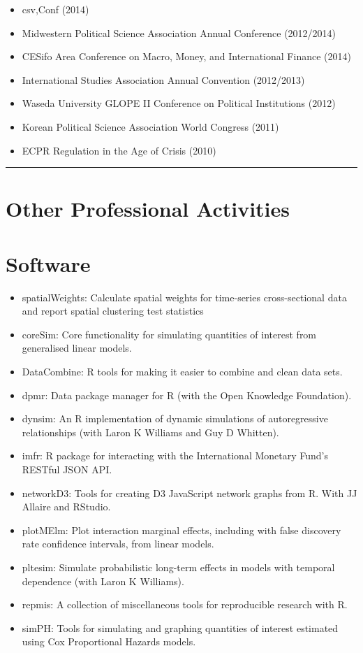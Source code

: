 \documentclass[a4paper]{article}
\begin{document}
\begin{itemize}
    \item csv,Conf (2014)
    \item Midwestern Political Science Association Annual Conference (2012/2014)
    \item CESifo Area Conference on Macro, Money, and International Finance (2014)
    \item International Studies Association Annual Convention (2012/2013)
    \item Waseda University GLOPE II Conference on Political Institutions (2012)
    \item Korean Political Science Association World Congress (2011)
    \item ECPR Regulation in the Age of Crisis (2010)
\end{itemize}


\vspace{0.25cm}
\medskip\hrule height 1pt
\vspace{0.5cm}

\section*{Other Professional Activities}

\section*{Software}

\begin{itemize}
    \item spatialWeights: Calculate spatial weights for time-series cross-sectional data and report spatial clustering test statistics
    \item coreSim: Core functionality for simulating quantities of interest from generalised linear models.
    \item DataCombine: R tools for making it easier to combine and clean data sets.
    \item dpmr: Data package manager for R (with the Open Knowledge Foundation).
    \item dynsim: An R implementation of dynamic simulations of autoregressive relationships (with Laron K Williams and Guy D Whitten).
    \item imfr: R package for interacting with the International Monetary Fund's RESTful JSON API.
    \item networkD3: Tools for creating D3 JavaScript network graphs from R. With JJ Allaire and RStudio.
    \item plotMElm: Plot interaction marginal effects, including with false discovery rate confidence intervals, from linear models.
    \item pltesim: Simulate probabilistic long-term effects in models with temporal dependence (with Laron K Williams).
    \item repmis: A collection of miscellaneous tools for reproducible research with R.
    \item simPH: Tools for simulating and graphing quantities of interest estimated using Cox Proportional Hazards models.
\end{itemize}
\end{document}
